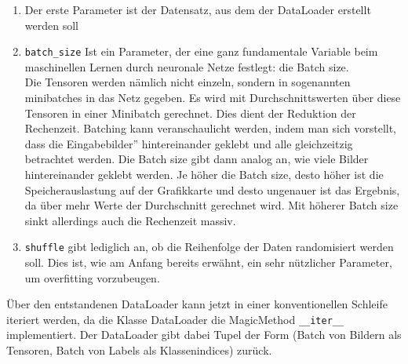 \documentclass[11pt]{article}
\begin{document}
\begin{enumerate}
	\item Der erste Parameter ist der Datensatz, aus dem der DataLoader erstellt werden soll
	\item \texttt{batch_size} Ist ein Parameter, der eine ganz fundamentale Variable beim maschinellen Lernen durch neuronale Netze festlegt: die Batch size.\\
	Die Tensoren werden nämlich nicht einzeln, sondern in sogenannten minibatches in das Netz gegeben. Es wird mit Durchschnittswerten über diese Tensoren in einer Minibatch gerechnet. Dies dient der Reduktion der Rechenzeit. Batching kann veranschaulicht werden, indem man sich vorstellt, dass die \glqq Eingabebilder'' hintereinander geklebt und alle gleichzeitzig betrachtet werden. Die Batch size gibt dann analog an, wie viele Bilder hintereinander geklebt werden. Je höher die Batch size, desto höher ist die Speicherauslastung auf der Grafikkarte und desto ungenauer ist das Ergebnis, da über mehr Werte der Durchschnitt gerechnet wird. Mit höherer Batch size sinkt allerdings auch die Rechenzeit massiv.
	\item \texttt{shuffle} gibt lediglich an, ob die Reihenfolge der Daten randomisiert werden soll. Dies ist, wie am Anfang bereits erwähnt, ein sehr nützlicher Parameter, um overfitting vorzubeugen.
\end{enumerate}
Über den entstandenen DataLoader kann jetzt in einer konventionellen Schleife iteriert werden, da die Klasse DataLoader die MagicMethod \texttt{__iter__} implementiert. Der DataLoader gibt dabei Tupel der Form (Batch von Bildern als Tensoren, Batch von Labels als Klassenindices) zurück.
\end{document}
